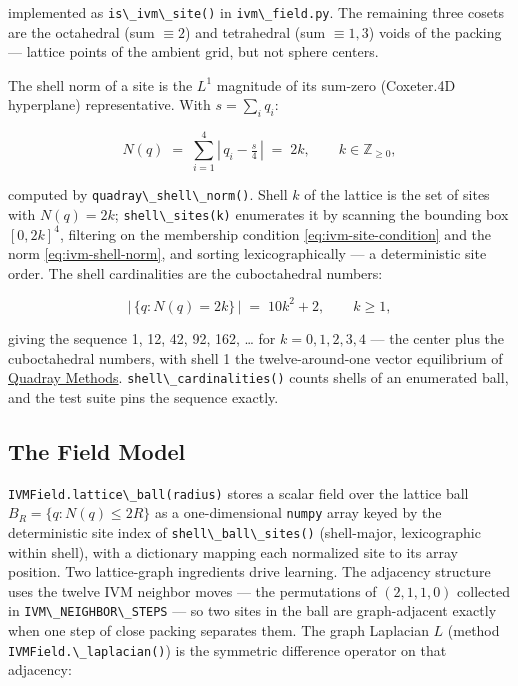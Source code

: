 \documentclass[
  10pt,
]{article}
\newcommand{\passthrough}[1]{#1}
\begin{document}
implemented as \passthrough{\lstinline!is\_ivm\_site()!} in
\passthrough{\lstinline!ivm\_field.py!}. The remaining three cosets are
the octahedral (sum \(\equiv 2\)) and tetrahedral (sum \(\equiv 1, 3\))
voids of the packing --- lattice points of the ambient grid, but not
sphere centers.

The shell norm of a site is the \(L^1\) magnitude of its sum-zero
(Coxeter.4D hyperplane) representative. With \(s = \sum_i q_i\):

\begin{equation}
\label{eq:ivm-shell-norm}
N(q) \;=\; \sum_{i=1}^{4} \left|\, q_i - \tfrac{s}{4} \,\right| \;=\; 2k, \qquad k \in \mathbb{Z}_{\geq 0},
\end{equation}

computed by \passthrough{\lstinline!quadray\_shell\_norm()!}. Shell
\(k\) of the lattice is the set of sites with \(N(q) = 2k\);
\passthrough{\lstinline!shell\_sites(k)!} enumerates it by scanning the
bounding box \([0, 2k]^4\), filtering on the membership condition
\eqref{eq:ivm-site-condition} and the norm \eqref{eq:ivm-shell-norm},
and sorting lexicographically --- a deterministic site order. The shell
cardinalities are the cuboctahedral numbers:

\begin{equation}
\label{eq:ivm-shell-cardinality}
\bigl|\, \{ q : N(q) = 2k \} \,\bigr| \;=\; 10k^2 + 2, \qquad k \geq 1,
\end{equation}

giving the sequence 1, 12, 42, 92, 162, \ldots{} for
\(k = 0, 1, 2, 3, 4\) --- the center plus the cuboctahedral numbers,
with shell 1 the twelve-around-one vector equilibrium of
\href{03_quadray_methods.md}{Quadray Methods}.
\passthrough{\lstinline!shell\_cardinalities()!} counts shells of an
enumerated ball, and the test suite pins the sequence exactly.

\subsection{The Field Model}\label{the-field-model}

\passthrough{\lstinline!IVMField.lattice\_ball(radius)!} stores a scalar
field over the lattice ball \(B_R = \{ q : N(q) \leq 2R \}\) as a
one-dimensional \passthrough{\lstinline!numpy!} array keyed by the
deterministic site index of
\passthrough{\lstinline!shell\_ball\_sites()!} (shell-major,
lexicographic within shell), with a dictionary mapping each normalized
site to its array position. Two lattice-graph ingredients drive
learning. The adjacency structure uses the twelve IVM neighbor moves ---
the permutations of \((2,1,1,0)\) collected in
\passthrough{\lstinline!IVM\_NEIGHBOR\_STEPS!} --- so two sites in the
ball are graph-adjacent exactly when one step of close packing separates
them. The graph Laplacian \(L\) (method
\passthrough{\lstinline!IVMField.\_laplacian()!}) is the symmetric
difference operator on that adjacency:
\end{document}
